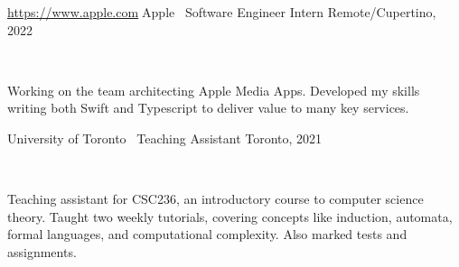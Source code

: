 \documentclass[]{style}
\begin{document}
\begin{entrylist}

\vspace{2mm}

\entry
{\url{https://www.apple.com}{Apple} \ {\normalfont Software Engineer Intern}}
{Remote/Cupertino, 2022}
{ ~ \vspace{-2.5mm}

  

Working on the team architecting Apple Media Apps. Developed my skills writing both Swift and Typescript to deliver value to many key services. 
}

\entry
{University of Toronto \ {\normalfont Teaching Assistant}}
{Toronto, 2021}
{ ~ \vspace{-2.5mm}

  

Teaching assistant for CSC236, an introductory course to computer science theory. Taught two weekly tutorials, covering concepts like induction, automata, formal languages, and computational complexity. Also marked tests and assignments. 
}

%
%
%
%
%

%
%
%

\end{entrylist}
\end{document}
